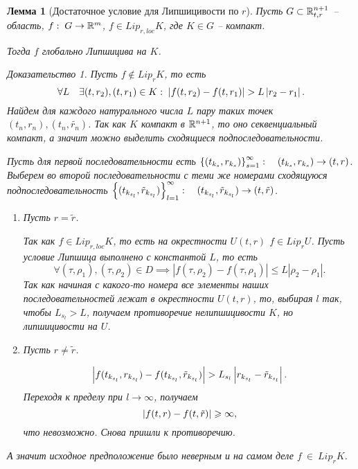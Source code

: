 \documentclass[a5paper, 10pt]{article}
\theoremstyle{definition}
\theoremstyle{plain}
\newtheorem{Lem}{Лемма}
\theoremstyle{remark}
\newtheorem*{Proof}{Доказательство}
\begin{document}
	\begin{Lem}[Достаточное условие для Липшицивости по $r$]
		Пусть $G \subset \mathbb{R}^{n+1}_{t,r}$ -- область, $f: \; G \rightarrow \mathbb{R}^m$, $f \in Lip_{r,loc} K$, где $K\in G$ -- компакт. 
		
		Тогда $f$ глобально Липшицива на $K$.
		
		\begin{Proof}
			Пусть $f\notin Lip_r K$, то есть
			\[
			\forall L \quad \exists (t,r_2), (t,r_1) \in K: \; \left|f(t,r_2) - f(t, r_1)\right| > L \left|r_2-r_1\right|.
			\]
			Найдем для каждого натурального числа $L$ пару таких точек $(t_n, r_n), (t_n, \tilde{r_n})$. Так как $K$ компакт в $\mathbb{R}^{n+1}$, то оно секвенциальный компакт, а значит можно выделить сходящиеся подпоследовательности.
			
			Пусть для первой последовательности есть $\left\{(t_{k_s}, r_{k_s})\right\}_{s=1}^{\infty}: \quad (t_{k_s}, r_{k_s}) \rightarrow (t,r)$. Выберем во второй последовательности с теми же номерами сходящуюся подпоследовательность $\left\{(t_{k_{s_l}}, \tilde{r}_{k_{s_l}})\right\}_{l=1}^{\infty}: \quad (t_{k_{s_l}}, \tilde{r}_{k_{s_l}}) \rightarrow (t,\tilde{r})$. 
			
			\begin{enumerate}
				\item Пусть $r=\tilde{r}$.
				
				Так как $f \in Lip_{r,loc} K$, то есть на окрестности $U(t,r)$ $f \in Lip_{r} U$. Пусть условие Липшица выполнено с константой $L$, то есть 
				\[
				\forall (\tau, \rho_1), (\tau,\rho_2) \in D \implies |f(\tau, \rho_2) - f(\tau,\rho_1)| \leqslant L |\rho_2-\rho_1|.
				\]
				Так как начиная с какого-то номера все элементы наших последовательностей лежат в окрестности $U(t,r)$, то, выбирая $l$ так, чтобы $L_{s_l} > L$, получаем противоречие нелипшицивости $K$, но липшицивости на $U$.
				\item Пусть $r\neq \tilde{r}$.
				
				\[
				\left|f(t_{k_{s_l}},r_{k_{s_l}}) - f(t_{k_{s_l}}, \tilde{r}_{k_{s_l}})\right| > L_{s_l} \left|r_{k_{s_l}}-\tilde{r}_{k_{s_l}}\right|.
				\]
				Переходя к пределу при $l \to \infty$, получаем
				\[
				\left|f(t,r)- f(t,\tilde{r})\right| \geqslant \infty,
				\]
				что невозможно. Снова пришли к противоречию. 
			\end{enumerate}
			 А значит исходное предположение было неверным и на самом деле $f~\in~Lip_r K$.
		\end{Proof} 
	\end{Lem}
	
\end{document}
